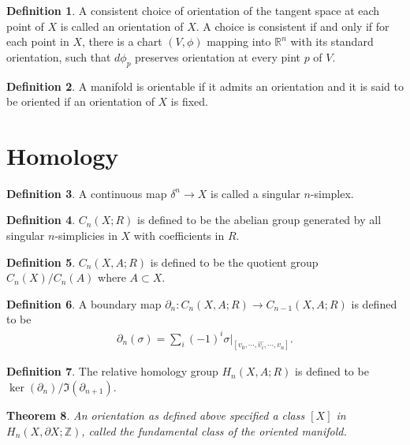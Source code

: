 \documentclass[11pt, psamsfonts]{amsart}
\newtheorem{thm}{Theorem}[section]
\theoremstyle{definition}
\newtheorem{defn}[thm]{Definition}
\theoremstyle{remark}
\numberwithin{equation}{section}
\begin{document}
\begin{defn}
  A consistent choice of orientation of the tangent space at each point of $X$ is called an orientation of $X$.
  A choice is consistent if and only if for each point in $X$, there is a chart $(V, \phi)$ mapping into $\mathbb{R}^n$ with its standard orientation, such that $d\phi_p$ preserves orientation at every pint $p$ of $V$.
\end{defn}

\begin{defn}
  A manifold is orientable if it admits an orientation and it is said to be oriented if an orientation of $X$ is fixed.
\end{defn}

\section{Homology}

\begin{defn}
  A continuous map $\delta^n \rightarrow X$ is called a singular $n$-simplex.
\end{defn}

\begin{defn}
  $C_n(X; R)$ is defined to be the abelian group generated by all singular $n$-simplicies in $X$ with coefficients in $R$.
\end{defn}

\begin{defn}
  $C_n(X, A; R)$ is defined to be the quotient group $C_n(X) / C_n(A)$ where $A \subset X$.
\end{defn}

\begin{defn}
  A boundary map $\partial_n: C_n(X, A; R) \rightarrow C_{n - 1}(X, A; R)$ is defined to be
  \begin{align*}
    \partial_n(\sigma) = \sum_{i} (-1)^i \sigma\vert_{[v_0, \cdots, \hat{v_i}, \cdots, v_n]}.
  \end{align*}
\end{defn}

\begin{defn}
  The relative homology group $H_n(X, A; R)$ is defined to be $\ker(\partial_n) / \Im(\partial_{n + 1})$.
\end{defn}

\begin{thm}
  An orientation as defined above specified a class $[X]$ in $H_n(X, \partial X; \mathbb{Z})$, called the fundamental class of the oriented manifold.
\end{thm}
\end{document}
